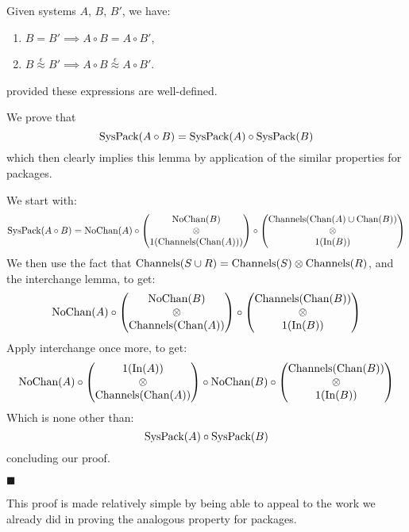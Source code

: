 \begin{lemma}
  \label{lemma:system_composition}
  Given systems $A$, $B$, $B'$, we have:
  \begin{enumerate}
    \item $B = B' \implies A \circ B = A \circ B'$,
    \item $B \overset{\epsilon}{\approx} B' \implies A \circ B \overset{\epsilon}{\approx} A \circ B'$.
  \end{enumerate}
  provided these expressions are well-defined.

   We prove that
  $$
  \text{SysPack}(A \circ B) = \text{SysPack}(A) \circ \text{SysPack}(B)
  $$
  which then clearly implies this lemma by application of the similar properties
  for packages.

  We start with:
  $$
  \text{SysPack}(A \circ B) = \text{NoChan}(A) \circ
  \begin{pmatrix}
    \text{NoChan}(B)\cr
    \otimes\cr
    1(\text{Channels}(\text{Chan}(A)))
  \end{pmatrix}
  \circ
  \begin{pmatrix}
    \text{Channels}(\text{Chan}(A) \cup \text{Chan}(B))\cr
    \otimes\cr
    1(\text{In}(B))
  \end{pmatrix}
  $$
  We then use the fact that $\text{Channels}(S \cup R) = \text{Channels}(S) \otimes \text{Channels}(R)$,
  and the interchange lemma, to get:
  $$
  \text{NoChan}(A) \circ
  \begin{pmatrix}
    \text{NoChan}(B)\cr
    \otimes\cr
    \text{Channels}(\text{Chan}(A))
  \end{pmatrix}
  \circ
  \begin{pmatrix}
    \text{Channels}(\text{Chan}(B))\cr
    \otimes\cr
    1(\text{In}(B))
  \end{pmatrix}
  $$
  Apply interchange once more, to get:
  $$
  \text{NoChan}(A) \circ
  \begin{pmatrix}
    1(\text{In}(A))\cr
    \otimes\cr
    \text{Channels}(\text{Chan}(A))
  \end{pmatrix}
  \circ
    \text{NoChan}(B)
  \circ
  \begin{pmatrix}
    \text{Channels}(\text{Chan}(B))\cr
    \otimes\cr
    1(\text{In}(B))
  \end{pmatrix}
  $$
  Which is none other than:
  $$
  \text{SysPack}(A) \circ \text{SysPack}(B)
  $$
  concluding our proof.

  $\blacksquare$
\end{lemma}

This proof is made relatively simple by being able to 
appeal to the work we already did in proving the analogous property
for packages.


